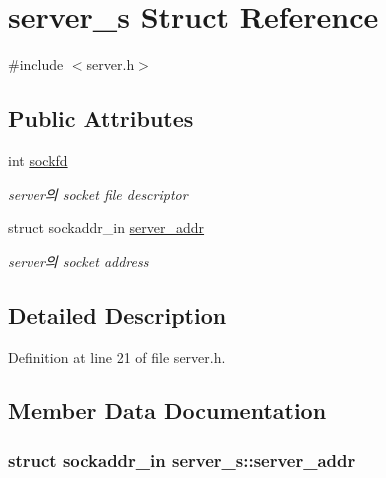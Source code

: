 \hypertarget{structserver__s}{\section{server\-\_\-s Struct Reference}
\label{structserver__s}
}


{\ttfamily \#include $<$server.\-h$>$}

\subsection*{Public Attributes}
\begin{DoxyCompactItemize}
\item 
int \hyperlink{structserver__s_a7109ed4db0376f7de840d82c4379099d}{sockfd}
\begin{DoxyCompactList}\small\item\em server의 socket file descriptor \end{DoxyCompactList}\item 
struct sockaddr\-\_\-in \hyperlink{structserver__s_aa49ed3594b99b1da4de179995dfa553d}{server\-\_\-addr}
\begin{DoxyCompactList}\small\item\em server의 socket address \end{DoxyCompactList}\end{DoxyCompactItemize}


\subsection{Detailed Description}


Definition at line 21 of file server.\-h.



\subsection{Member Data Documentation}
\hypertarget{structserver__s_aa49ed3594b99b1da4de179995dfa553d}{
\subsubsection[{server\-\_\-addr}]{\setlength{\rightskip}{0pt plus 5cm}struct sockaddr\-\_\-in server\-\_\-s\-::server\-\_\-addr}}\label{structserver__s_aa49ed3594b99b1da4de179995dfa553d}


